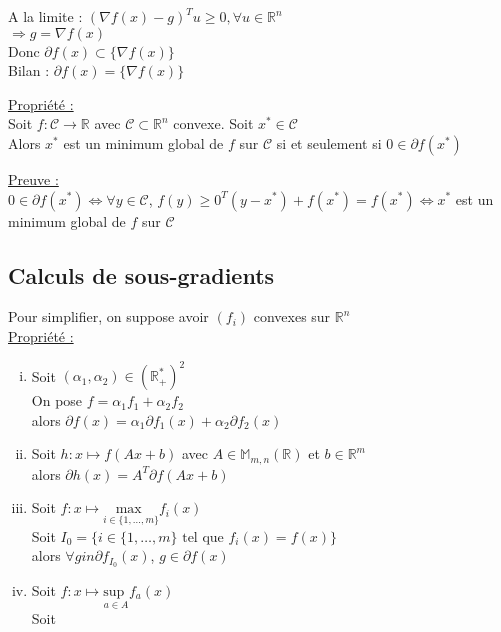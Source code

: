 \documentclass[12pt,a4paper]{article}
\begin{document}
\begin{enumerate}[i)]
\begin{itemize}
        A la limite : $(\nabla f(x) - g)^T u \geq 0, \forall u \in \mathbb{R}^n$\\
        $\Rightarrow g = \nabla f(x)$\\

        Donc $\partial f(x) \subset \{\nabla f(x)\}$\\

        Bilan : $\partial f(x) = \{\nabla f(x)\}$\\
    \end{itemize}
\end{enumerate}

\color{black}

\underline{Propriété :}\\
Soit $f : \mathcal{C} \rightarrow \mathbb{R}$ avec $\mathcal{C} \subset \mathbb{R}^n$ convexe.
Soit $x^* \in \mathcal{C}$\\
Alors $x^*$ est un minimum global de $f$ sur $\mathcal{C}$ si et seulement si $0 \in \partial f(x^*)$\\

\color{blue}

\underline{Preuve :}\\
$0 \in \partial f(x^*) \Leftrightarrow \forall y \in \mathcal{C}$, $f(y) \geq 0^T(y - x^*) + f(x^*) = f(x^*) \Leftrightarrow x^*$ est un minimum global de $f$ sur $\mathcal{C}$\\

\color{black}

\subsection{Calculs de sous-gradients}

Pour simplifier, on suppose avoir $(f_i)$ convexes sur $\mathbb{R}^n$\\

\underline{Propriété :}
\begin{enumerate}[i)]
    \item Soit $(\alpha_1, \alpha_2) \in (\mathbb{R}_+^*)^2$\\
    On pose $f = \alpha_1 f_1 + \alpha_2 f_2$\\
    alors $\partial f(x) = \alpha_1 \partial f_1(x) + \alpha_2 \partial f_2(x)$

    \item Soit $h : x \mapsto f(Ax + b)$ avec $A \in \mathbb{M}_{m,n}(\mathbb{R})$ et $b \in \mathbb{R}^m$\\
    alors $\partial h(x) = A^T \partial f(Ax + b)$

    \item Soit $f : x \mapsto \underset{i \in \{1, \dots, m\}}{\text{max }} f_i(x)$\\
    Soit $I_0 = \{i \in \{1, \dots, m\} \text{ tel que } f_i(x) = f(x)\}$\\
    alors $\forall g in \partial f_{I_0}(x)$, $g \in \partial f(x)$\\

    \item Soit $f : x \mapsto \underset{a \in A}{\text{sup }} f_a(x)$\\
    Soit 
\end{enumerate}
\end{document}
